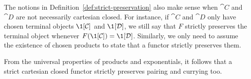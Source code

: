 The notions in Definition~\ref{def:strict-preservation} also make sense when $\cat{C}$ and $\cat{D}$ are not necessarily cartesian closed. For instance, if $\cat{C}$ and $\cat{D}$ only have chosen terminal objects $\1[\cat{C}]$ and $\1[\cat{D}]$, we still say that $F$ strictly preserves the terminal object whenever $F(\1[\cat{C}]) = \1[\cat{D}]$. Similarly, we only need to assume the existence of chosen products to state that a functor strictly preserves them.

From the universal properties of products and exponentials, it follows that a strict cartesian closed functor strictly preserves pairing and currying too.

